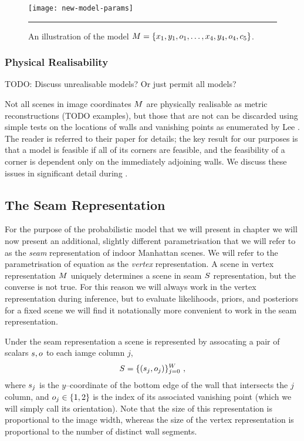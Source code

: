 \begin{figure}[tb]
  \centering
  \label{fig:scene-params}
  \texttt{[image: new-model-params]}
  \caption{An illustration of the model
    $\Scene=\{x_1,y_1,\WallOrient_1,\ldots,x_4,y_4,\WallOrient_4,c_5\}$.}
  \hrule
\end{figure}

\subsubsection{Physical Realisability}

TODO: Discuss unrealisable models? Or just permit all models?

Not all scenes in image coordinates $\Scene$ are physically realisable
as metric reconstructions (TODO examples), but those that are not can
be discarded using simple tests on the locations of walls and
vanishing points as enumerated by Lee \etal \cite{Lee09}. The reader
is referred to their paper for details; the key result for our
purposes is that a model is feasible if all of its corners are
feasible, and the feasibility of a corner is dependent only on the
immediately adjoining walls. We discuss these issues in significant
detail during .

\subsection{The Seam Representation}
\label{sec:seam-representation}

For the purpose of the probabilistic model that we will present in
chapter  we will now present an additional, slightly
different parametrisation that we will refer to as the \textit{seam}
representation of indoor Manhattan scenes. We will refer to the
parametrisation of equation  as the
\textit{vertex} representation. A scene in vertex representation
$\Scene$ uniquely determines a scene in seam $\Seam$ representation,
but the converse is not true. For this reason we will always work in
the vertex representation during inference, but to evaluate
likelihoods, priors, and posteriors for a fixed scene we will find it
notationally more convenient to work in the seam representation.

Under the seam representation a scene is represented by assocating a
pair of scalars $\seam,\WallOrient$ to each iamge column $j$,
\begin{equation}
  \label{eq:seam-def}
  \Seam = \{(\seam_j,\WallOrient_j)\}_{j=0}^\Width  ~,
\end{equation}
where $\seam_j$ is the $y$--coordinate of the bottom edge of the wall
that intersects the $j$\th column, and $\WallOrient_j\in\{1,2\}$ is
the index of its associated vanishing point (which we will simply call
its orientation). Note that the size of this representation is
proportional to the image width, whereas the size of the vertex
representation is proportional to the number of distinct wall
segments.

